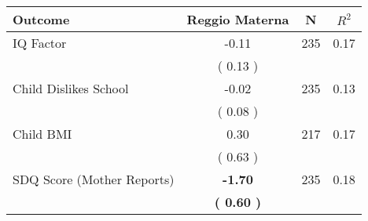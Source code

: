 \begin{tabular}{lccc}
\toprule
 \textbf{Outcome} & \textbf{Reggio Materna} & \textbf{N} & \textbf{$ R^2$} \\
\midrule
IQ Factor &     -0.11 & 235 &      0.17 \\ 
 & (     0.13 ) & \\
Child Dislikes School &     -0.02 & 235 &      0.13 \\ 
 & (     0.08 ) & \\
Child BMI &      0.30 & 217 &      0.17 \\ 
 & (     0.63 ) & \\
SDQ Score (Mother Reports) & \textbf{    -1.70} & 235 &      0.18 \\ 
 & \textbf{(     0.60 )} & \\
\bottomrule
\end{tabular}
